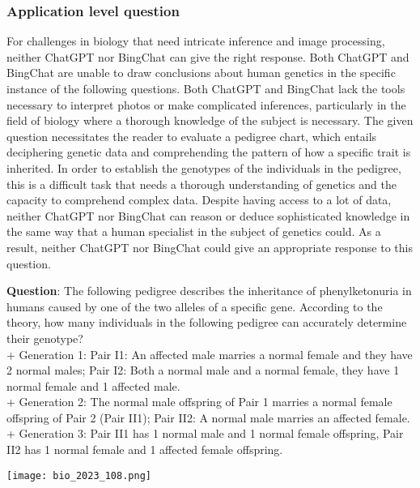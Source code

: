 \documentclass{article}
\begin{document}
{\begin{mdframed}[linewidth=1pt,linecolor=red]
	\end{mdframed}	
	
	\subsubsection{Application level question}
	\label{VNHSGE_Bio_A}
	
	For challenges in biology that need intricate inference and image processing, neither ChatGPT nor BingChat can give the right response. Both ChatGPT and BingChat are unable to draw conclusions about human genetics in the specific instance of the following questions. Both ChatGPT and BingChat lack the tools necessary to interpret photos or make complicated inferences, particularly in the field of biology where a thorough knowledge of the subject is necessary. The given question necessitates the reader to evaluate a pedigree chart, which entails deciphering genetic data and comprehending the pattern of how a specific trait is inherited. In order to establish the genotypes of the individuals in the pedigree, this is a difficult task that needs a thorough understanding of genetics and the capacity to comprehend complex data. Despite having access to a lot of data, neither ChatGPT nor BingChat can reason or deduce sophisticated knowledge in the same way that a human specialist in the subject of genetics could. As a result, neither ChatGPT nor BingChat could give an appropriate response to this question.
	
	
	
	\begin{mdframed}[linewidth=1pt,linecolor=red] \textbf{Question}: The following pedigree describes the inheritance of phenylketonuria in humans caused by one of the two alleles of a specific gene. According to the theory, how many individuals in the following pedigree can accurately determine their genotype?\\	
		+ Generation 1: Pair I1: An affected male marries a normal female and they have 2 normal males; Pair I2: Both a normal male and a normal female, they have 1 normal female and 1 affected male. \\
		+ Generation 2: The normal male offspring of Pair 1 marries a normal female offspring of Pair 2 (Pair II1); Pair II2: A normal male marries an affected female. \\
		+ Generation 3: Pair II1 has 1 normal male and 1 normal female offspring, Pair II2 has 1 normal female and 1 affected female offspring.
		
		\texttt{[image: bio\_2023\_108.png]}
		

\end{mdframed}}
\end{document}
